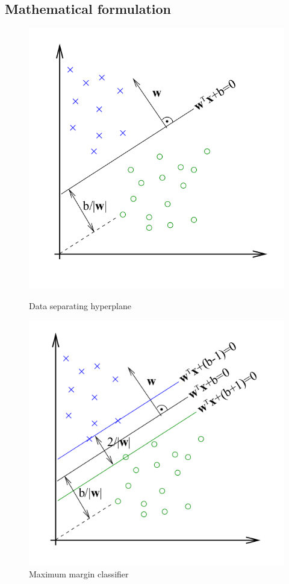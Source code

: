 \subsection{Mathematical formulation}
\begin{figure}
\centering
\begin{minipage}{.5\textwidth}
  \centering
  \includegraphics[width=.95\textwidth]{figures/SVMFigure1.png}
  \caption{Data separating hyperplane}
  \label{fig:SVM1}
\end{minipage}%
\begin{minipage}{.5\textwidth}
  \centering
  \includegraphics[width=.95\textwidth]{figures/SVMFigure2.png}
  \caption{Maximum margin classifier}
  \label{fig:SVM2}
\end{minipage}
\end{figure}

